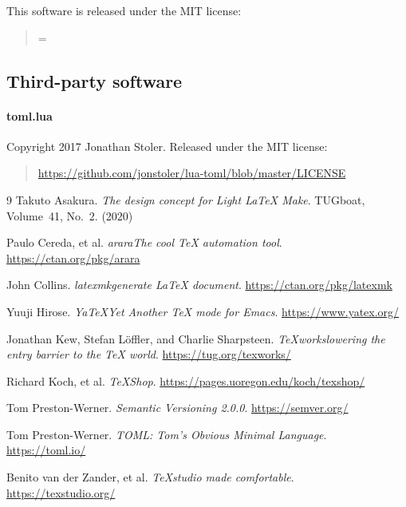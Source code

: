 \documentclass{llmk-doc}
\begin{document}
This software is released under the MIT license:
%
\begin{quotation}
\parindent=0pt
\parskip=\baselineskip
\small\ttfamily
\noindent
\printLICENSE
\end{quotation}

\subsection*{Third-party software}

\paragraph{toml.lua} Copyright 2017 Jonathan Stoler. Released under the MIT
license:
%
\begin{quote}
\url{https://github.com/jonstoler/lua-toml/blob/master/LICENSE}
\end{quote}

\begin{thebibliography}{9}
  Takuto Asakura. \textit{The design concept for \Dash Light {\LaTeX}
  Make}. TUGboat, Volume~41, No.~2. (2020)

  Paulo Cereda, et al. \textit{arara\Dash The cool {\TeX} automation
  tool}. \url{https://ctan.org/pkg/arara}

  John Collins. \textit{latexmk\Dash generate {\LaTeX} document}.
  \url{https://ctan.org/pkg/latexmk}

  Yuuji Hirose. \textit{YaTeX\Dash Yet Another TeX mode for Emacs}.
  \url{https://www.yatex.org/}

  Jonathan Kew, Stefan L\"offler, and Charlie Sharpsteen.
  \textit{{\TeX}works\Dash lowering the entry barrier to the {\TeX} world}.
  \url{https://tug.org/texworks/}

  Richard Koch, et al. \textit{{\TeX}Shop}.
  \url{https://pages.uoregon.edu/koch/texshop/}

  Tom Preston-Werner. \textit{Semantic Versioning 2.0.0}.
  \url{https://semver.org/}

  Tom Preston-Werner. \textit{TOML: Tom's Obvious Minimal Language}.
  \url{https://toml.io/}

  Benito van der Zander, et al.
  \textit{{\TeX}studio\Dash {\LaTeX} made comfortable}.\\
  \url{https://texstudio.org/}
\end{thebibliography}
\end{document}
